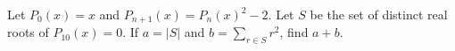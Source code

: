 Let $P_0(x)=x$ and $P_{n+1}(x)=P_n(x)^2-2$. Let $S$ be the set of distinct real roots of $P_{10}(x)=0$. If $a=|S|$ and $b=\sum_{r\in S}r^2$, find $a+b$.
